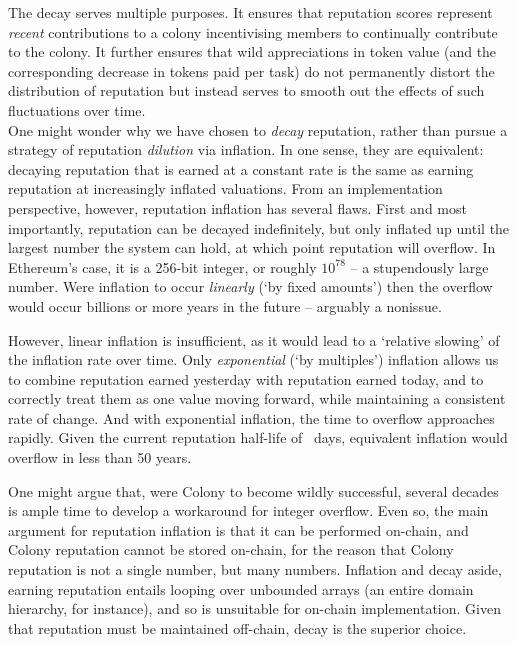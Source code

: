 The decay serves multiple purposes. It ensures that reputation scores represent \emph{recent} contributions to a colony incentivising members to continually contribute to the colony. It further ensures that wild appreciations in token value (and the corresponding decrease in tokens paid per task) do not permanently distort the distribution of reputation but instead serves to smooth out the effects of such fluctuations over time. \\

One might wonder why we have chosen to \textit{decay} reputation, rather than pursue a strategy of reputation \textit{dilution} via inflation. In one sense, they are equivalent: decaying reputation that is earned at a constant rate is the same as earning reputation at increasingly inflated valuations. From an implementation perspective, however, reputation inflation has several flaws. First and most importantly, reputation can be decayed indefinitely, but only inflated up until the largest number the system can hold, at which point reputation will overflow. In Ethereum's case, it is a 256-bit integer, or roughly $10^{78}$ -- a stupendously large number. Were inflation to occur \textit{linearly} (`by fixed amounts') then the overflow would occur billions or more years in the future -- arguably a nonissue.

However, linear inflation is insufficient, as it would lead to a `relative slowing' of the inflation rate over time. Only \textit{exponential} (`by multiples') inflation allows us to combine reputation earned yesterday with reputation earned today, and to correctly treat them as one value moving forward, while maintaining a consistent rate of change. And with exponential inflation, the time to overflow approaches rapidly. Given the current reputation half-life of \repdecayduration\ days, equivalent inflation would overflow in less than 50 years.

One might argue that, were Colony to become wildly successful, several decades is ample time to develop a workaround for integer overflow. Even so, the main argument for reputation inflation is that it can be performed on-chain, and Colony reputation cannot be stored on-chain, for the reason that Colony reputation is not a single number, but many numbers. Inflation and decay aside, earning reputation entails looping over unbounded arrays (an entire domain hierarchy, for instance), and so is unsuitable for on-chain implementation. Given that reputation must be maintained off-chain, decay is the superior choice.

